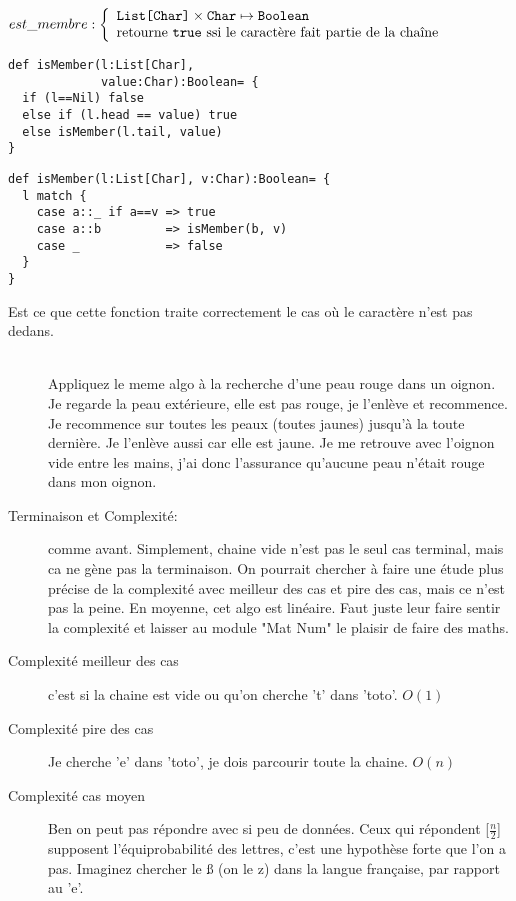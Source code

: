 \documentclass[10pt]{article}\usepackage[correction,nu]{esial}
\begin{document}
\begin{Question}
  $est\_membre: \left\{
    \begin{array}{l}
      \text{\texttt{List[Char]}}\times \text{\texttt{Char}}\mapsto \text{\texttt{Boolean}}\\
      \text{retourne \text{\texttt{true}} ssi le caractère fait partie de la chaîne}
    \end{array}\right.$  
\end{Question}
\begin{Reponse}
\noindent
  \begin{minipage}{.43\linewidth}
  \begin{Verbatim}
def isMember(l:List[Char], 
             value:Char):Boolean= {
  if (l==Nil) false
  else if (l.head == value) true
  else isMember(l.tail, value)
}

  \end{Verbatim}    
  \end{minipage}
  \begin{minipage}{.55\linewidth}
  \begin{Verbatim}[numbers=right]
def isMember(l:List[Char], v:Char):Boolean= {
  l match {
    case a::_ if a==v => true
    case a::b         => isMember(b, v)
    case _            => false
  }
}
  \end{Verbatim}        
  \end{minipage}

  \begin{description}
  \item[Est ce que cette fonction traite correctement le cas où le caractère
    n'est pas dedans.] ~\\ Appliquez le meme algo à la recherche d'une peau
    rouge dans un oignon. Je regarde la peau extérieure, elle est pas rouge, je
    l'enlève et recommence. Je recommence sur toutes les peaux (toutes jaunes)
    jusqu'à la toute dernière. Je l'enlève aussi car elle est jaune. Je me
    retrouve avec l'oignon vide entre les mains, j'ai donc l'assurance qu'aucune
    peau n'était rouge dans mon oignon.
  \item[Terminaison et Complexité:] comme avant. Simplement, chaine vide n'est
    pas le seul cas terminal, mais ca ne gène pas la terminaison. On pourrait
    chercher à faire une étude plus précise de la complexité avec meilleur des
    cas et pire des cas, mais ce n'est pas la peine. En moyenne, cet algo est
    linéaire. Faut juste leur faire sentir la complexité et laisser au module
    "Mat Num" le plaisir de faire des maths.
  \item[Complexité meilleur des cas] c'est si la chaine est vide ou qu'on
    cherche 't' dans 'toto'. $O(1)$
  \item[Complexité pire des cas] Je cherche 'e' dans 'toto', je dois parcourir
    toute la chaine. $O(n)$
  \item[Complexité cas moyen] Ben on peut pas répondre avec si peu de
    données. Ceux qui répondent [$\frac{n}{2}$] supposent l'équiprobabilité des
    lettres, c'est une hypothèse forte que l'on a pas. Imaginez chercher le ß
    (on le z) dans la langue française, par rapport au 'e'.
  \end{description}
\end{Reponse}
\end{document}
